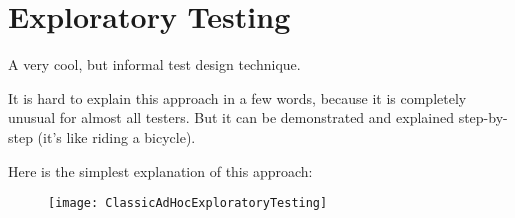 \section{Exploratory Testing}
\label{sec:Exploratory Testing}

A very cool, but informal test design technique.

It is hard to explain this approach in a few words, because it is completely unusual for almost all testers. But it can be demonstrated and explained step-by-step (it's like riding a bicycle).

Here is the simplest explanation of this approach:

\begin{figure}[!h]
\centering
\texttt{[image: ClassicAdHocExploratoryTesting]}
\caption{}
\label{fig:ClassicAdHocExploratoryTesting}
\end{figure}
